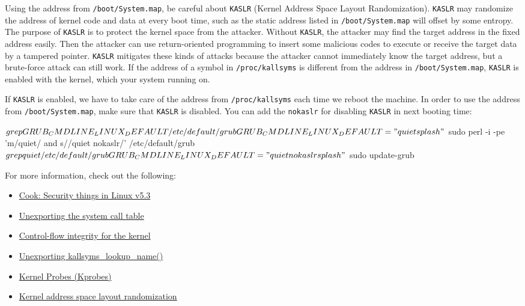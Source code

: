 \documentclass[10pt, oneside]{book}
\begin{document}
Using the address from \verb|/boot/System.map|, be careful about \verb|KASLR| (Kernel Address Space Layout Randomization).
\verb|KASLR| may randomize the address of kernel code and data at every boot time, such as the static address listed in \verb|/boot/System.map| will offset by some entropy.
The purpose of \verb|KASLR| is to protect the kernel space from the attacker.
Without \verb|KASLR|, the attacker may find the target address in the fixed address easily.
Then the attacker can use return-oriented programming to insert some malicious codes to execute or receive the target data by a tampered pointer.
\verb|KASLR| mitigates these kinds of attacks because the attacker cannot immediately know the target address, but a brute-force attack can still work.
If the address of a symbol in \verb|/proc/kallsyms| is different from the address in \verb|/boot/System.map|, \verb|KASLR| is enabled with the kernel, which your system running on.
If \verb|KASLR| is enabled, we have to take care of the address from \verb|/proc/kallsyms| each time we reboot the machine.
In order to use the address from \verb|/boot/System.map|, make sure that \verb|KASLR| is disabled.
You can add the \verb|nokaslr| for disabling \verb|KASLR| in next booting time:
\begin{codebash}
$ grep GRUB_CMDLINE_LINUX_DEFAULT /etc/default/grub
GRUB_CMDLINE_LINUX_DEFAULT="quiet splash"
$ sudo perl -i -pe 'm/quiet/ and s//quiet nokaslr/' /etc/default/grub
$ grep quiet /etc/default/grub
GRUB_CMDLINE_LINUX_DEFAULT="quiet nokaslr splash"
$ sudo update-grub
\end{codebash}

For more information, check out the following:

\begin{itemize}
  \item \href{https://lwn.net/Articles/804849/}{Cook: Security things in Linux v5.3}
  \item \href{https://lwn.net/Articles/12211/}{Unexporting the system call table}
  \item \href{https://lwn.net/Articles/810077/}{Control-flow integrity for the kernel}
  \item \href{https://lwn.net/Articles/813350/}{Unexporting kallsyms\_lookup\_name()}
  \item \href{https://www.kernel.org/doc/Documentation/kprobes.txt}{Kernel Probes (Kprobes)}
  \item \href{https://lwn.net/Articles/569635/}{Kernel address space layout randomization}
\end{itemize}
\end{document}
